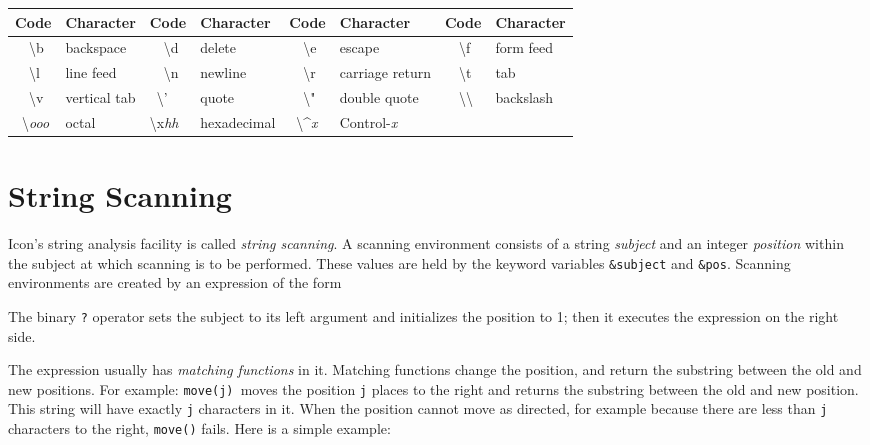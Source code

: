 \begin{center}
\tablehead{}
\begin{supertabular}{|m{0.49in}|m{0.883in}|m{0.52in}|m{0.858in}|m{0.45in}|m{0.896in}|m{0.45in}|m{0.729in}|}
\hline
\sffamily\bfseries Code &
\sffamily\bfseries Character &
\sffamily\bfseries Code &
\sffamily\bfseries Character &
\sffamily\bfseries Code &
\sffamily\bfseries Character &
\sffamily\bfseries Code &
\sffamily\bfseries Character\\\hline
\ \ {\textbackslash}b &
backspace &
\ \ {\textbackslash}d &
delete &
\ \ {\textbackslash}e &
escape &
\ \ {\textbackslash}f &
form feed\\\hline
\ \ {\textbackslash}l &
line feed &
\ \ {\textbackslash}n &
newline &
\ \ {\textbackslash}r &
carriage return &
\ \ {\textbackslash}t &
tab\\\hline
\ \ {\textbackslash}v &
vertical tab &
\ {\textbackslash}' &
quote &
\ \ {\textbackslash}" &
double quote &
\ \ {\textbackslash}{\textbackslash} &
backslash\\\hline
\ {\textbackslash}\textit{ooo} &
octal &
{\textbackslash}x\textit{hh} &
hexadecimal  &
\ {\textbackslash}\^{}\textit{x} &
Control-\textit{x} &
~
 &
~
\\\hline
\end{supertabular}
\end{center}

\section{String Scanning}

Icon's string analysis facility is called
\textit{string scanning}. A
scanning environment consists of a string
\textit{subject} and an
integer \textit{position} within the subject at
which scanning is to be performed. These values are held by the keyword
variables \texttt{\&subject} and \texttt{\&pos}. Scanning environments
are created by an expression of the form


The binary \texttt{?} operator sets the subject to its left argument and
initializes the position to 1; then it executes the expression on the
right side.

The expression usually has \textit{matching
functions} in it. Matching functions change the position, and return
the substring between the old and new positions. For example:
\texttt{move(j)}\texttt{ }moves the position \texttt{j} places to the
right and returns the substring between the old and new position. This
string will have exactly \texttt{j} characters in it. When the position
cannot move as directed, for example because there are less than
\texttt{j} characters to the right, \texttt{move()}
fails. Here is a simple example:


